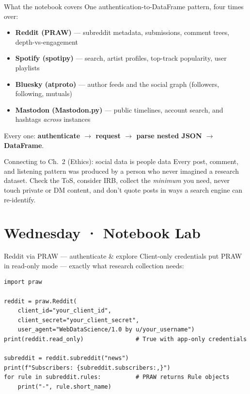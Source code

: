 \documentclass[9pt,aspectratio=169]{beamer}
\begin{document}
\begin{frame}{What the notebook covers}
    One authentication-to-DataFrame pattern, four times over:
    \begin{itemize}
        \item \textbf{Reddit (PRAW)} --- subreddit metadata, submissions, comment trees, depth-vs-engagement
        \item \textbf{Spotify (spotipy)} --- search, artist profiles, top-track popularity, user playlists
        \item \textbf{Bluesky (atproto)} --- author feeds and the social graph (followers, following, mutuals)
        \item \textbf{Mastodon (Mastodon.py)} --- public timelines, account search, and hashtags \textit{across} instances
    \end{itemize}
    Every one: \textbf{authenticate $\rightarrow$ request $\rightarrow$ parse nested JSON $\rightarrow$ DataFrame}.

    \vspace{0.8em}

    \begin{alertblock}{Connecting to Ch.~2 (Ethics): social data is people data}
        \footnotesize Every post, comment, and listening pattern was produced by a person who never imagined a research dataset. Check the ToS, consider IRB, collect the \textit{minimum} you need, never touch private or DM content, and don't quote posts in ways a search engine can re-identify.
    \end{alertblock}
\end{frame}

\section{Wednesday · Notebook Lab}

\begin{frame}[fragile]{Reddit via PRAW --- authenticate \& explore}
    Client-only credentials put PRAW in read-only mode --- exactly what research collection needs:
\begin{lstlisting}
import praw

reddit = praw.Reddit(
    client_id="your_client_id",
    client_secret="your_client_secret",
    user_agent="WebDataScience/1.0 by u/your_username")
print(reddit.read_only)               # True with app-only credentials

subreddit = reddit.subreddit("news")
print(f"Subscribers: {subreddit.subscribers:,}")
for rule in subreddit.rules:          # PRAW returns Rule objects
    print("-", rule.short_name)
\end{lstlisting}
\end{frame}
\end{document}
